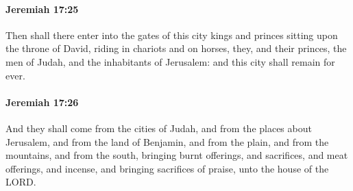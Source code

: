 		\paragraph{Jeremiah 17:25} %
			\label{JEREMIAH-17-25}

			Then shall there enter into the gates of this city kings and princes sitting upon the throne of David, riding in chariots and on horses, they, and their princes, the men of Judah, and the inhabitants of Jerusalem: and this city shall remain for ever.


		\paragraph{Jeremiah 17:26} %
			\label{JEREMIAH-17-26}

			And they shall come from the cities of Judah, and from the places about Jerusalem, and from the land of Benjamin, and from the plain, and from the mountains, and from the south, bringing burnt offerings, and sacrifices, and meat offerings, and incense, and bringing sacrifices of praise, unto the house of the LORD.

